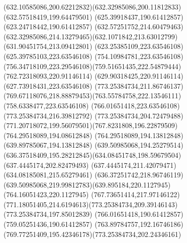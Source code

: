 {{\curveto(632.10585086,200.62212832)(632.32985086,200.11812833)(632.57518419,199.64479501)
\lineto(625.39918437,190.61412857)
\lineto(623.24718442,190.61412857)
\closepath
\moveto(632.57251752,214.60479463)
\curveto(632.32985086,214.13279465)(632.1071842,213.63012799)(631.90451754,213.09412801)
\lineto(623.25385109,223.63546108)
\lineto(625.39785103,223.63546108)
\closepath
\moveto(754.10984781,223.63546108)
\curveto(756.34718109,223.29546108)(759.51651435,222.54879444)(762.72318093,220.91146114)
\lineto(629.90318425,220.91146114)
\lineto(627.73918431,223.63546108)
\closepath
\moveto(773.25384734,211.86746137)
\curveto(769.67118076,218.88879453)(763.55784758,222.13546111)(758.6338477,223.63546108)
\lineto(766.01651418,223.63546108)
\lineto(773.25384734,216.39812792)
\closepath
\moveto(773.25384734,204.72479488)
\curveto(771.20718072,199.56079501)(767.8231808,196.22879509)(764.29518089,194.08612848)
\lineto(764.29518089,194.13812848)
\lineto(639.89785067,194.13812848)
\curveto(639.50985068,194.25279514)(636.37518409,195.28212845)(634.08451748,198.59679504)
\lineto(637.4445174,202.82479493)
\lineto(637.4445174,211.42079471)
\lineto(634.08185081,215.65279461)
\curveto(636.37251742,218.96746119)(639.50985068,219.99812783)(639.895184,220.1127945)
\lineto(764.16051423,220.1127945)
\curveto(767.73651414,217.97146122)(771.18051405,214.6194613)(773.25384734,209.39146143)
\closepath
\moveto(773.25384734,197.85012839)
\lineto(766.01651418,190.61412857)
\lineto(759.05251436,190.61412857)
\curveto(763.89784757,192.16746186)(769.77251409,195.42346178)(773.25384734,202.24346161)
\closepath
}
}
{
}